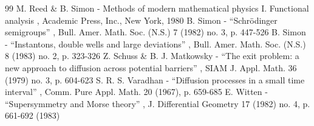 \documentclass[11pt]{article}
\numberwithin{equation}{section}
\theoremstyle{definition}
\begin{document}
\begin{thebibliography}{99}
 M. Reed \& B. Simon - Methods of modern mathematical physics I. Functional analysis , Academic Press, Inc., New York, 1980
 B. Simon - “Schrödinger semigroups” , Bull. Amer. Math. Soc. (N.S.) 7 (1982) no. 3, p. 447-526
 B. Simon - “Instantons, double wells and large deviations” , Bull. Amer. Math. Soc. (N.S.) 8 (1983) no. 2, p. 323-326
 Z. Schuss \& B. J. Matkowsky - “The exit problem: a new approach to diffusion across potential barriers” , SIAM J. Appl. Math. 36 (1979) no. 3, p. 604-623
 S. R. S. Varadhan - “Diffusion processes in a small time interval” , Comm. Pure Appl. Math. 20 (1967), p. 659-685
 E. Witten - “Supersymmetry and Morse theory” , J. Differential Geometry 17 (1982) no. 4, p. 661-692 (1983)
\end{thebibliography}
\end{document}
